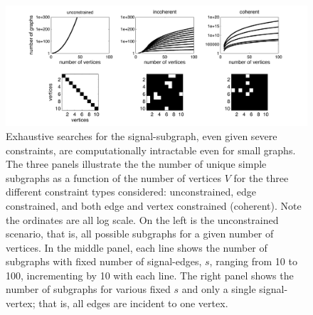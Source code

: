 \documentclass[10pt,journal,cspaper,compsoc]{IEEEtran}
\begin{document}



\begin{figure}[tb!]
	\centering
		\includegraphics[width=1.0\linewidth]{num_of_graphs.pdf}
	\caption{Exhaustive searches for the signal-subgraph, even given severe constraints, are computationally intractable even for small graphs.  The three panels illustrate the 
	the number of unique simple subgraphs as a function of the number of vertices $V$
	for the three different constraint types considered: unconstrained, edge constrained, and both edge and vertex constrained (coherent).  Note the ordinates are all log scale.   On the left is the unconstrained scenario, that is, all possible subgraphs for a given number of vertices.  In the middle panel, each line shows the number of subgraphs with fixed number of signal-edges, $s$, ranging from 10 to 100, incrementing by 10 with each line.  The right panel shows the number of subgraphs for various fixed $s$ and only a single signal-vertex; that is, all edges are incident to one vertex.  %
	}
	\label{fig:numgraphs}
\end{figure}
\end{document}
